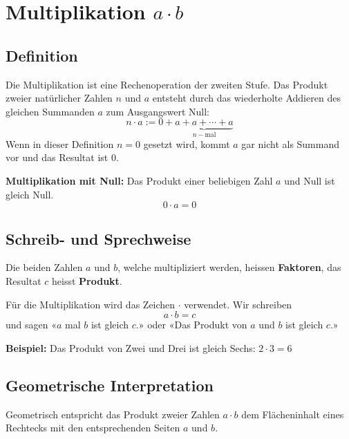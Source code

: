 \newpage
\section{Multiplikation $a\cdot b$}

\subsection{Definition}
Die Multiplikation ist eine Rechenoperation der zweiten Stufe. Das Produkt zweier natürlicher Zahlen $n$ und $a$ entsteht durch das wiederholte Addieren des gleichen Summanden $a$ zum Ausgangswert Null:
\[
  n\cdot a := 0+\underbrace{a+a+\cdots+a}_{n-\text{mal}}
\]
Wenn in dieser Definition $n=0$ gesetzt wird, kommt $a$ gar nicht als Summand vor und das Resultat ist $0$.
\begin{theorem}
  \textbf{Multiplikation mit Null:} Das Produkt einer beliebigen Zahl $a$ und Null ist gleich Null.
  \[
    0 \cdot a = 0
  \]
\end{theorem}

\subsection{Schreib- und Sprechweise}
Die beiden Zahlen $a$ und $b$, welche multipliziert werden, heissen \textbf{Faktoren}, das Resultat $c$ heisst \textbf{Produkt}.

Für die Multiplikation wird das Zeichen $\cdot$ verwendet. Wir schreiben
\[
  a \cdot b = c
\]
und sagen «$a$ mal $b$ ist gleich $c$.» oder «Das Produkt von $a$ und $b$ ist gleich $c$.»
\begin{example}
  \textbf{Beispiel:} Das Produkt von Zwei und Drei ist gleich Sechs: $2 \cdot 3 = 6$
\end{example}

\subsection{Geometrische Interpretation}

Geometrisch entspricht das Produkt zweier Zahlen $a\cdot b$ dem Flächeninhalt eines Rechtecks mit den entsprechenden Seiten $a$ und $b$.

